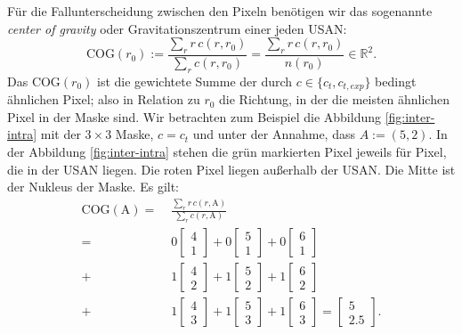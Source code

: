 \documentclass[a4paper, 11pt]{report}
\renewcommand{\emph}[1]{\textit{#1}}
\theoremstyle{definition}
\begin{document}
			Für die Fallunterscheidung zwischen den Pixeln benötigen wir das sogenannte \emph{center of gravity} oder Gravitationszentrum einer jeden USAN:
				$$ \text{COG}(r_0) := \frac	{\sum_r r\,c(r,r_0)} {\sum_r c(r,r_0)} = \frac	{\sum_r r\,c(r,r_0)} {n(r_0)} \in \mathbb{R}^2.$$
			Das $\text{COG}(r_0)$ ist die gewichtete Summe der durch $c \in \{c_t, c_{t,exp}\}$ bedingt ähnlichen Pixel; also in Relation zu $r_0$ die Richtung, in der die meisten ähnlichen Pixel in der Maske sind.
			Wir betrachten zum Beispiel die Abbildung \ref{fig:inter-intra} mit der $3\times3$ Maske, $c = c_t$ und unter der Annahme, dass $A := (5,2)$. In der Abbildung \ref{fig:inter-intra} stehen die grün markierten Pixel jeweils für Pixel, die in der USAN liegen. Die roten Pixel liegen außerhalb der USAN. Die Mitte ist der Nukleus der Maske. Es gilt:
			\begin{align*}
				\text{COG}(\text{A})
				= &\;\frac{\sum_r r\,c(r,\text{A})} {\sum_r c(r, \text{A})} \\
				= &\;0\begin{bmatrix}4\\1\end{bmatrix} + 0\begin{bmatrix}5\\1\end{bmatrix} + 0\begin{bmatrix}6\\1\end{bmatrix} \\
				+ &\;1\begin{bmatrix}4\\2\end{bmatrix} + 1\begin{bmatrix}5\\2\end{bmatrix} + 1\begin{bmatrix}6\\2\end{bmatrix} \\
				+ &\;1\begin{bmatrix}4\\3\end{bmatrix} + 1\begin{bmatrix}5\\3\end{bmatrix} + 1\begin{bmatrix}6\\3\end{bmatrix} = \begin{bmatrix}5\\2.5\end{bmatrix}.
			\end{align*}
\end{document}
